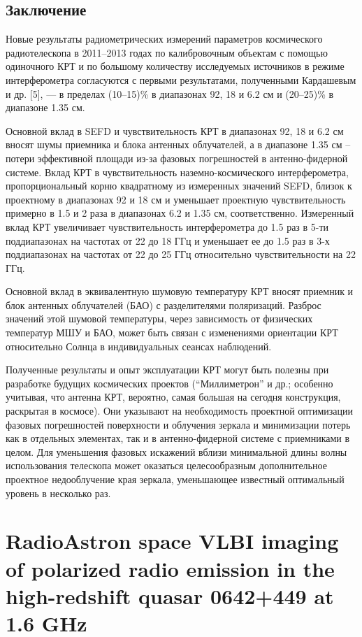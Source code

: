 \subsection{Заключение}

Новые результаты радиометрических измерений параметров космического радиотелескопа в 2011–2013 годах
по калибровочным объектам с помощью одиночного КРТ и по большому количеству исследуемых источников в
режиме интерферометра согласуются с первыми результатами, полученными Кардашевым и др. [5], --- в
пределах (10--15)\% в диапазонах 92, 18 и 6.2 см и (20--25)\% в диапазоне 1.35 см.

Основной вклад в SEFD и чувствительность КРТ в диапазонах 92, 18 и 6.2 см вносят шумы приемника и
блока антенных облучателей, а в диапазоне 1.35 см – потери эффективной площади из-за фазовых
погрешностей в антенно-фидерной системе. Вклад КРТ в чувствительность наземно-космического
интерферометра, пропорциональный корню квадратному из измеренных значений SEFD, близок к проектному
в диапазонах 92 и 18 см и уменьшает проектную чувствительность примерно в 1.5 и 2 раза в диапазонах
6.2 и 1.35 см, соответственно. Измеренный вклад КРТ увеличивает чувствительность интерферометра до
1.5 раз в 5-ти поддиапазонах на частотах от 22 до 18 ГГц и уменьшает ее до 1.5 раз в 3-х
поддиапазонах на частотах от 22 до 25 ГГц относительно чувствительности на 22 ГГц.

Основной вклад в эквивалентную шумовую температуру КРТ вносят приемник и блок антенных облучателей
(БАО) с разделителями поляризаций. Разброс значений этой шумовой температуры, через зависимость от
физических температур МШУ и БАО, может быть связан с изменениями ориентации КРТ относительно Солнца
в индивидуальных сеансах наблюдений.

Полученные результаты и опыт эксплуатации КРТ могут быть полезны при разработке будущих космических
проектов (``Миллиметрон'' и др.; особенно учитывая, что антенна КРТ, вероятно, самая большая на
сегодня конструкция, раскрытая в космосе). Они указывают на необходимость проектной оптимизации
фазовых погрешностей поверхности и облучения зеркала и минимизации потерь как в отдельных элементах,
так и в антенно-фидерной системе с приемниками в целом. Для уменьшения фазовых искажений вблизи
минимальной длины волны использования телескопа может оказаться целесообразным дополнительное
проектное недооблучение края зеркала, уменьшающее известный оптимальный уровень в несколько раз.


\section{RadioAstron space VLBI imaging of polarized radio emission in the high-redshift quasar
0642+449 at 1.6 GHz}

